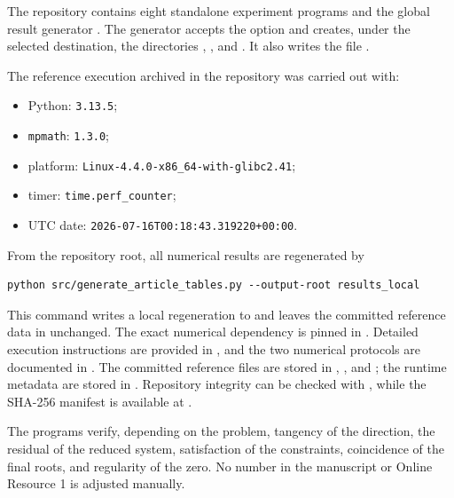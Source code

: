 \documentclass[11pt]{article}
\begin{document}
The repository contains eight standalone experiment programs and the global
result generator . The generator accepts
the option  and creates, under the selected destination,
the directories , , and
. It also writes the file
.

The reference execution archived in the repository was carried out with:
\begin{itemize}[nosep,leftmargin=*]
    \item Python: \texttt{3.13.5};
    \item \texttt{mpmath}: \texttt{1.3.0};
    \item platform: \nolinkurl{Linux-4.4.0-x86_64-with-glibc2.41};
    \item timer: \nolinkurl{time.perf_counter};
    \item UTC date: \nolinkurl{2026-07-16T00:18:43.319220+00:00}.
\end{itemize}

From the repository root, all numerical results are regenerated by
\begin{verbatim}
python src/generate_article_tables.py --output-root results_local
\end{verbatim}
This command writes a local regeneration to  and leaves
the committed reference data in  unchanged. The exact numerical
dependency is pinned in . Detailed execution instructions
are provided in , and the two numerical protocols
are documented in . The committed reference
files are stored in ,
, and ; the runtime
metadata are stored in . Repository
integrity can be checked with , while the
SHA-256 manifest is available at .

The programs verify, depending on the problem, tangency of the direction,
the residual of the reduced system, satisfaction of the constraints, coincidence
of the final roots, and regularity of the zero. No number in the manuscript or
Online Resource 1 is adjusted manually.
\endgroup
\end{document}
